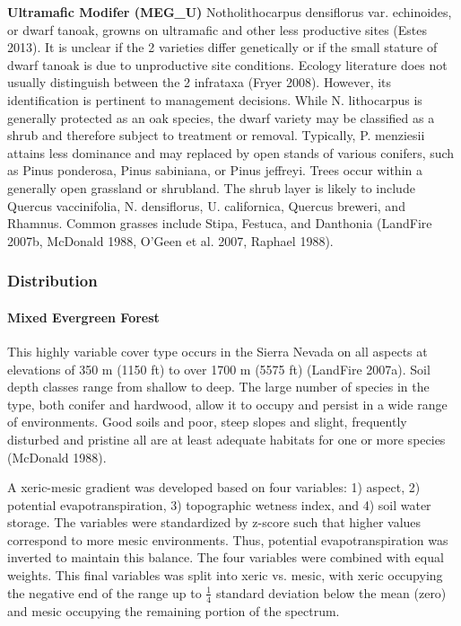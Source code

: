 \begin{adjustwidth}{2cm}{}
\medskip
\noindent \textbf{Ultramafic Modifer (MEG\_U)}
Notholithocarpus densiflorus var. echinoides, or dwarf tanoak, growns on ultramafic and other less productive sites (Estes 2013). It is unclear if the 2 varieties differ genetically or if the small stature of dwarf tanoak is due to unproductive site conditions. Ecology literature does not usually distinguish between the 2 infrataxa (Fryer 2008). However, its identification is pertinent to management decisions. While N. lithocarpus is generally protected as an oak species, the dwarf variety may be classified as a shrub and therefore subject to treatment or removal. Typically, P. menziesii attains less dominance and may replaced by open stands of various conifers, such as Pinus ponderosa, Pinus sabiniana, or Pinus jeffreyi. Trees occur within a generally open grassland or shrubland. The shrub layer is likely to include Quercus vaccinifolia, N. densiflorus, U. californica, Quercus breweri, and Rhamnus. Common grasses include Stipa, Festuca, and Danthonia (LandFire 2007b, McDonald 1988, O’Geen et al. 2007, Raphael 1988). 

\end{adjustwidth}

\subsubsection{Distribution}
\paragraph{Mixed Evergreen Forest}		This highly variable cover type occurs in the Sierra Nevada on all aspects at elevations of 350 m (1150 ft) to over 1700 m (5575 ft) (LandFire 2007a). Soil depth classes range from shallow to deep. The large number of species in the type, both conifer and hardwood, allow it to occupy and persist in a wide range of environments. Good soils and poor, steep slopes and slight, frequently disturbed and pristine all are at least adequate habitats for one or more species (McDonald 1988).

A xeric-mesic gradient was developed based on four variables: 1) aspect, 2) potential evapotranspiration, 3) topographic wetness index, and 4) soil water storage. The variables were standardized by z-score such that higher values correspond to more mesic environments. Thus, potential evapotranspiration was inverted to maintain this balance. The four variables were combined with equal weights. This final variables was split into xeric vs. mesic, with xeric occupying the negative end of the range up to $\frac{1}{4}$ standard deviation below the mean (zero) and mesic occupying the remaining portion of the spectrum.

